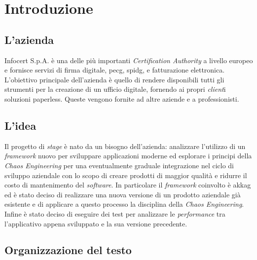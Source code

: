 
\chapter{Introduzione}
\label{cap:introduzione}

\section{L'azienda}

Infocert S.p.A. è una delle più importanti \textit{Certification Authority} a livello europeo
e fornisce servizi di firma digitale, \gls{pecg}, \gls{spidg}, e fatturazione elettronica. L’obiettivo principale
dell’azienda è quello di rendere disponibili tutti gli strumenti per la creazione di un
ufficio digitale, fornendo ai propri \textit{client}i soluzioni paperless. Queste vengono fornite
ad altre aziende e a professionisti.

\section{L'idea}
Il progetto di \textit{stage} è nato da un bisogno dell'azienda: analizzare l'utilizzo di un \textit{\textit{framework}} nuovo per sviluppare applicazioni moderne ed esplorare i principi della \textit{\textit{Chaos Engineering}} per una eventualmente graduale integrazione nel ciclo di sviluppo aziendale con lo scopo di creare prodotti di maggior qualità e ridurre il costo di mantenimento del \textit{software}.
In particolare il \textit{\textit{framework}} coinvolto è \gls{akkag} ed è stato deciso di realizzare una nuova versione di un prodotto aziendale già esistente e di applicare a questo processo la disciplina della \textit{Chaos Engineering}.
Infine è stato deciso di eseguire dei test per analizzare le \textit{performance} tra l'applicativo appena sviluppato e la sua versione precedente.

\section{Organizzazione del testo}

